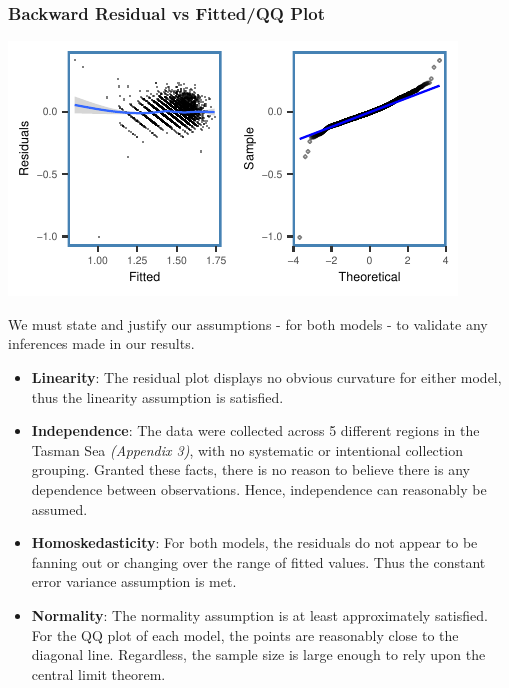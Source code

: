 \documentclass[letterpaper,9pt,twocolumn,twoside,]{pinp}
\providecommand{\tightlist}{%
  \setlength{\itemsep}{0pt}\setlength{\parskip}{0pt}}
\begin{document}
\hypertarget{backward-residual-vs-fittedqq-plot}{%
\subsubsection{Backward Residual vs Fitted/QQ
Plot}\label{backward-residual-vs-fittedqq-plot}}

\begin{center}\includegraphics{ExecSum_files/figure-latex/unnamed-chunk-5-1} \end{center}

We must state and justify our assumptions - for both models - to
validate any inferences made in our results.

\begin{itemize}
\tightlist
\item
  \textbf{Linearity}: The residual plot displays no obvious curvature
  for either model, thus the linearity assumption is satisfied.
\item
  \textbf{Independence}: The data were collected across 5 different
  regions in the Tasman Sea \textit{(Appendix 3)}, with no systematic or
  intentional collection grouping. Granted these facts, there is no
  reason to believe there is any dependence between observations. Hence,
  independence can reasonably be assumed.
\item
  \textbf{Homoskedasticity}: For both models, the residuals do not
  appear to be fanning out or changing over the range of fitted values.
  Thus the constant error variance assumption is met.
\item
  \textbf{Normality}: The normality assumption is at least approximately
  satisfied. For the QQ plot of each model, the points are reasonably
  close to the diagonal line. Regardless, the sample size is large
  enough to rely upon the central limit theorem.
\end{itemize}
\end{document}
